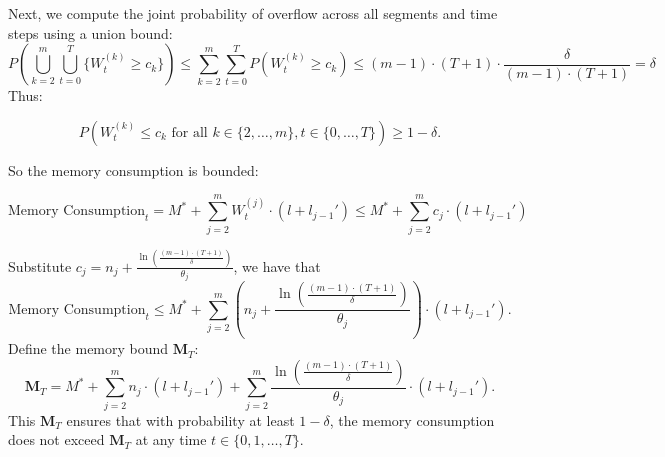 Next, we compute the joint probability of overflow across all segments and time steps using a union bound:
\[ P\left( \bigcup_{k=2}^m \bigcup_{t=0}^T \{ W_t^{(k)} \geq c_k \} \right) \leq \sum_{k=2}^m \sum_{t=0}^T P\left( W_t^{(k)} \geq c_k \right)\leq (m - 1) \cdot (T + 1) \cdot \frac{\delta}{(m - 1) \cdot (T + 1)} = \delta \]
Thus:

\[ P\left( W_t^{(k)} \leq c_k \text{ for all } k \in \{2, \dots, m\}, t \in \{0, \dots, T\} \right) \geq 1 - \delta. \]

So the memory consumption is bounded:

\[ \text{Memory Consumption}_t = M^* + \sum_{j=2}^m W_t^{(j)} \cdot (l + l_{j-1}')\leq M^* + \sum_{j=2}^m c_j \cdot (l + l_{j-1}') \]

Substitute \(c_j = n_j + \frac{\ln\left( \frac{(m - 1) \cdot (T + 1)}{\delta} \right)}{\theta_j} \), we have that
\[ \text{Memory Consumption}_t \leq M^* + \sum_{j=2}^m \left( n_j + \frac{\ln\left( \frac{(m - 1) \cdot (T + 1)}{\delta} \right)}{\theta_j} \right) \cdot (l + l_{j-1}'). \]
Define the memory bound \( \mathbf{M}_T \):
\[ \mathbf{M}_T = M^* + \sum_{j=2}^m n_j \cdot (l + l_{j-1}') + \sum_{j=2}^m \frac{\ln\left( \frac{(m - 1) \cdot (T + 1)}{\delta} \right)}{\theta_j} \cdot (l + l_{j-1}'). \]
This \( \mathbf{M}_T \) ensures that with probability at least \( 1 - \delta \), the memory consumption does not exceed \( \mathbf{M}_T \) at any time \( t \in \{0, 1, \dots, T\} \).



